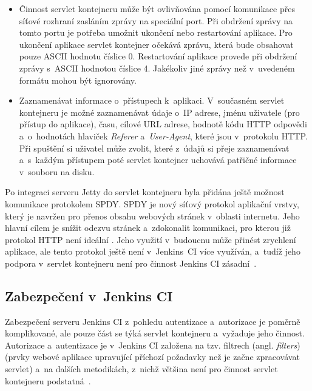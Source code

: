 \begin{itemize}
                \item Činnost servlet kontejneru může být ovlivňována pomocí komunikace přes síťové rozhraní zasláním zprávy
                    na speciální port. Při obdržení zprávy na tomto portu je potřeba umožnit ukončení nebo restartování aplikace.
                    Pro ukončení aplikace servlet kontejner očekává zprávu, která bude obsahovat pouze ASCII hodnotu číslice 0.
                    Restartování aplikace provede při obdržení zprávy s~ASCII hodnotou číslice 4. Jakékoliv
                    jiné zprávy než v~uvedeném formátu mohou být ignorovány.

                \item Zaznamenávat informace o~přístupech k~aplikaci. V~současném servlet kontejneru je možné zaznamenávat
                    údaje o~IP adrese, jménu uživatele (pro přístup do aplikace), času, cílové URL adrese, hodnotě 
                    kódu HTTP odpovědi a~o~hodnotách hlaviček \emph{Referer} a~\emph{User-Agent}, které jsou v~protokolu HTTP.
                    Při spuštění si uživatel může zvolit, které z~údajů si přeje zaznamenávat a~s~každým přístupem poté 
                    servlet kontejner uchovává patřičné informace v~souboru na disku.

            \end{itemize}
            

            Po integraci serveru Jetty do servlet kontejneru byla přidána ještě možnost
            komunikace protokolem SPDY. SPDY je nový síťový protokol aplikační vrstvy, který je
            navržen pro přenos obsahu webových stránek v~oblasti internetu. Jeho hlavní cílem je snížit odezvu stránek a~zdokonalit
            komunikaci, pro kterou již protokol HTTP není ideální \cite{spdyArticle}.
            Jeho využití v~budoucnu může přinést zrychlení aplikace, ale 
            tento protokol ještě není 
            v~Jenkins~CI více využíván, a~tudíž jeho podpora v~servlet kontejneru není pro činnost Jenkins CI zásadní~\cite{kohsukeTopic}.
        
        \subsection{Zabezpečení v~Jenkins CI} \label{secSecurityArchitecture}
            Zabezpečení serveru Jenkins CI z~pohledu autentizace a~autorizace je poměrně komplikované,
            ale pouze část se týká servlet kontejneru a~vyžaduje jeho činnost. 
            Autorizace a~autentizace je v~Jenkins CI založena na tzv. filtrech (angl. \emph{filters})
            (prvky webové aplikace upravující příchozí požadavky než je začne zpracovávat servlet) 
            a~na dalších metodikách, z~nichž většina není pro činnost servlet kontejneru podstatná~\cite{securityArchitectureJenkins}. 
            

